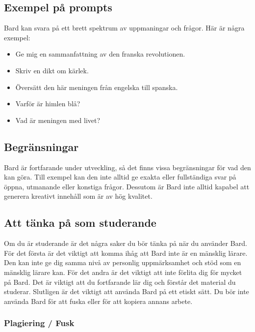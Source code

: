 \hypertarget{exempel-puxe5-prompts}{%
\subsection{Exempel på prompts}\label{exempel-puxe5-prompts}}

Bard kan svara på ett brett spektrum av uppmaningar och frågor. Här är
några exempel:

\begin{itemize}
\tightlist
\item
  Ge mig en sammanfattning av den franska revolutionen.
\item
  Skriv en dikt om kärlek.
\item
  Översätt den här meningen från engelska till spanska.
\item
  Varför är himlen blå?
\item
  Vad är meningen med livet?
\end{itemize}

\hypertarget{begruxe4nsningar}{%
\subsection{Begränsningar}\label{begruxe4nsningar}}

Bard är fortfarande under utveckling, så det finns vissa begränsningar
för vad den kan göra. Till exempel kan den inte alltid ge exakta eller
fullständiga svar på öppna, utmanande eller konstiga frågor. Dessutom är
Bard inte alltid kapabel att generera kreativt innehåll som är av hög
kvalitet.

\hypertarget{att-tuxe4nka-puxe5-som-studerande}{%
\subsection{Att tänka på som
studerande}\label{att-tuxe4nka-puxe5-som-studerande}}

Om du är studerande är det några saker du bör tänka på när du använder
Bard. För det första är det viktigt att komma ihåg att Bard inte är en
mänsklig lärare. Den kan inte ge dig samma nivå av personlig
uppmärksamhet och stöd som en mänsklig lärare kan. För det andra är det
viktigt att inte förlita dig för mycket på Bard. Det är viktigt att du
fortfarande lär dig och förstår det material du studerar. Slutligen är
det viktigt att använda Bard på ett etiskt sätt. Du bör inte använda
Bard för att fuska eller för att kopiera annans arbete.

\hypertarget{plagiering-fusk}{%
\subsubsection{Plagiering / Fusk}\label{plagiering-fusk}}

